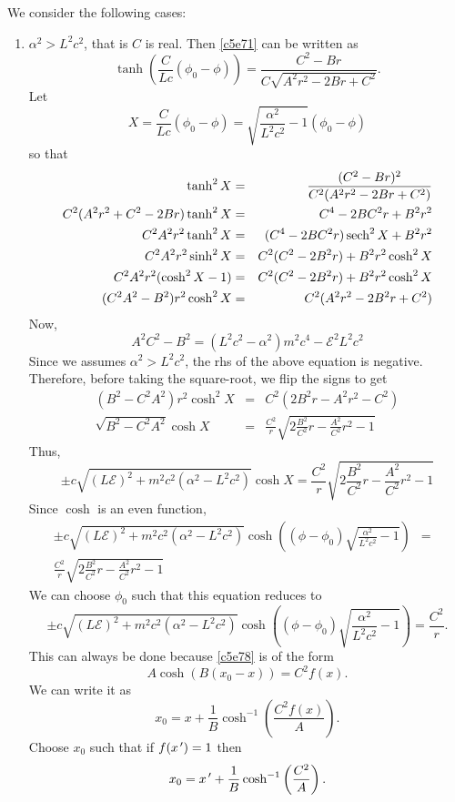 \begin{enumerate}
We consider the following cases:
\begin{enumerate}
\item $\alpha^2 > L^2c^2$, that is $C$ is real. Then \eqref{c5e71} can be written as
\[
\tanh\left(\frac{C}{Lc}(\phi_0 - \phi)\right) = \frac{C^2 - Br}{C\sqrt{A^2r^2 - 2Br + C^2}}.
\]
Let
\begin{equation}\label{c5e77}
X = \frac{C}{Lc}(\phi_0 - \phi) = \sqrt{\frac{\alpha^2}{L^2c^2} - 1}(\phi_0 - \phi)
\end{equation}
so that
\begin{eqnarray*}
\tanh^2 X &=& \frac{(C^2 - Br)^2}{C^2(A^2r^2 - 2Br + C^2)} \\
C^2(A^2r^2 + C^2 - 2Br)\tanh^2X &=& C^4 - 2BC^2r + B^2r^2 \\
C^2A^2r^2\tanh^2X &=& (C^4 - 2BC^2r)\operatorname{sech}^2X + B^2r^2 \\
C^2A^2r^2\sinh^2X &=& C^2(C^2 - 2B^2r) + B^2r^2\cosh^2X \\
C^2A^2r^2(\cosh^2X - 1) &=& C^2(C^2 - 2B^2r) + B^2r^2\cosh^2X \\
(C^2A^2 - B^2)r^2\cosh^2X &=& C^2(A^2r^2 - 2B^2r + C^2)
\end{eqnarray*}
Now,
\[
A^2C^2-B^2 = (L^2c^2 -\alpha^2)m^2c^4 -\mathcal{E}^2L^2c^2
\]
Since we assumes $\alpha^2 > L^2c^2$, the rhs of the above equation is negative.
Therefore, before taking the square-root, we flip the signs to get
\begin{eqnarray*}
(B^2 - C^2A^2)r^2\cosh^2X &=& C^2(2B^2r - A^2r^2 - C^2) \\
\sqrt{B^2 - C^2A^2}\cosh X &=& \frac{C^2}{r}\sqrt{2\frac{B^2}{C^2}r - \frac{A^2}{C^2}r^2 - 1}
\end{eqnarray*}
Thus,
\[
\pm c\sqrt{(L\mathcal{E})^2 + m^2c^2(\alpha^2 - L^2c^2)}\cosh X = 
\frac{C^2}{r}\sqrt{2\frac{B^2}{C^2}r - \frac{A^2}{C^2}r^2 - 1}
\]
Since $\cosh$ is an even function,
\begin{eqnarray}
\pm c\sqrt{(L\mathcal{E})^2 + m^2c^2(\alpha^2 - L^2c^2)}
\cosh\left((\phi - \phi_0)\sqrt{\frac{\alpha^2}{L^2c^2} - 1}\right) &=& \nonumber\\
\frac{C^2}{r}\sqrt{2\frac{B^2}{C^2}r - \frac{A^2}{C^2}r^2 - 1} \label{c5e78}
\end{eqnarray}
We can choose $\phi_0$ such that this equation reduces to
\begin{equation}\label{c5e79}
\pm c\sqrt{(L\mathcal{E})^2 + m^2c^2(\alpha^2 - L^2c^2)}
\cosh\left((\phi - \phi_0)\sqrt{\frac{\alpha^2}{L^2c^2} - 1}\right) = \frac{C^2}{r}.
\end{equation}
This can always be done because \eqref{c5e78} is of the form
\begin{equation}\label{c5e80}
A\cosh(B(x_0-x)) = C^2f(x).
\end{equation}
We can write it as
\begin{equation}\label{c5e81}
x_0 = x + \frac{1}{B}\cosh^{-1}\left(\frac{C^2f(x)}{A}\right).
\end{equation}
Choose $x_0$ such that if $f(x^{\,\prime}) = 1$ then
\begin{equation}\label{c5e82}
x_0 = x^{\,\prime} + \frac{1}{B}\cosh^{-1}\left(\frac{C^2}{A}\right).
\end{equation}


\end{enumerate}
\end{enumerate}
